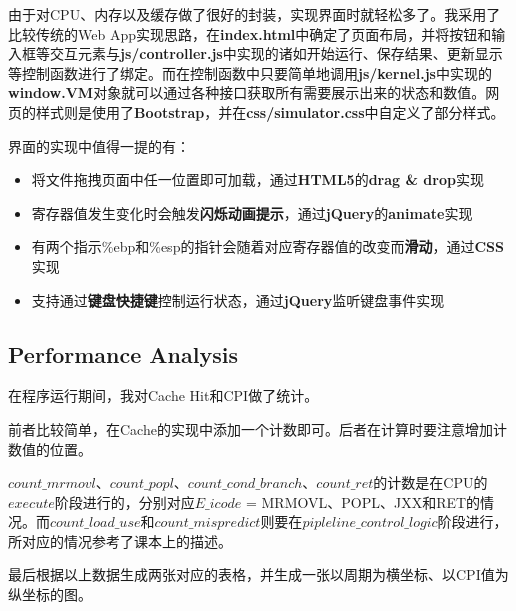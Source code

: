 由于对CPU、内存以及缓存做了很好的封装，实现界面时就轻松多了。我采用了比较传统的Web App实现思路，在{\bf index.html}中确定了页面布局，并将按钮和输入框等交互元素与{\bf js/controller.js}中实现的诸如开始运行、保存结果、更新显示等控制函数进行了绑定。而在控制函数中只要简单地调用{\bf js/kernel.js}中实现的{\bf window.VM}对象就可以通过各种接口获取所有需要展示出来的状态和数值。网页的样式则是使用了{\bf Bootstrap}，并在{\bf css/simulator.css}中自定义了部分样式。

界面的实现中值得一提的有：
\begin{itemize}
\item 将文件拖拽页面中任一位置即可加载，通过{\bf HTML5}的{\bf drag \& drop}实现
\item 寄存器值发生变化时会触发{\bf 闪烁动画提示}，通过{\bf jQuery}的{\bf animate}实现
\item 有两个指示\%ebp和\%esp的指针会随着对应寄存器值的改变而{\bf 滑动}，通过{\bf CSS}实现
\item 支持通过{\bf 键盘快捷键}控制运行状态，通过{\bf jQuery}监听键盘事件实现
\end{itemize}

\subsection{Performance Analysis}

在程序运行期间，我对Cache Hit和CPI做了统计。

前者比较简单，在Cache的实现中添加一个计数即可。后者在计算时要注意增加计数值的位置。

$count\_mrmovl$、$count\_popl$、$count\_cond\_branch$、$count\_ret$的计数是在CPU的{\bf $execute$}阶段进行的，分别对应$E\_icode$ = MRMOVL、POPL、JXX和RET的情况。而$count\_load\_use$和$count\_mispredict$则要在{\bf $pipleline\_control\_logic$}阶段进行，所对应的情况参考了课本上的描述。

最后根据以上数据生成两张对应的表格，并生成一张以周期为横坐标、以CPI值为纵坐标的图。